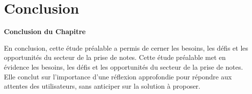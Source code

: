 

























\section{Conclusion}


\vspace{1cm}
\begin{center}
\textbf{\large Conclusion du Chapitre}
\end{center}

\noindent
En conclusion, cette étude préalable a permis de cerner les besoins, les défis et les opportunités du secteur de la prise de notes. Cette étude préalable met en évidence les besoins, les défis et les opportunités du secteur de la prise de notes. Elle conclut sur l'importance d'une réflexion approfondie pour répondre aux attentes des utilisateurs, sans anticiper sur la solution à proposer.